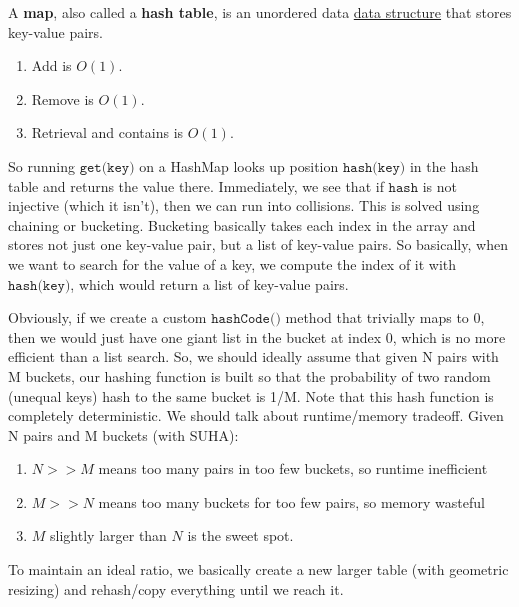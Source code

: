   \begin{definition}[Maps]
    \label{def:maps}
    A \textbf{map}, also called a \textbf{hash table}, is an unordered data \hyperref[def:data-structure]{data structure} that stores key-value pairs.   
    \begin{enumerate}
      \item Add is $O(1)$. 
      \item Remove is $O(1)$. 
      \item Retrieval and contains is $O(1)$. 
    \end{enumerate}
  \end{definition}

  So running $\texttt{get(key)}$ on a HashMap looks up position $\texttt{hash(key)}$ in the hash table and returns the value there. Immediately, we see that if $\texttt{hash}$ is not injective (which it isn't), then we can run into collisions. This is solved using chaining or bucketing. Bucketing basically takes each index in the array and stores not just one key-value pair, but a list of key-value pairs. So basically, when we want to search for the value of a key, we compute the index of it with $\texttt{hash(key)}$, which would return a list of key-value pairs. 

  Obviously, if we create a custom $\texttt{hashCode()}$ method that trivially maps to 0, then we would just have one giant list in the bucket at index 0, which is no more efficient than a list search. So, we should ideally assume that given N pairs with M buckets, our hashing function is built so that the probability of two random (unequal keys) hash to the same bucket is 1/M. Note that this hash function is completely deterministic. We should talk about runtime/memory tradeoff. Given N pairs and M buckets (with SUHA): 
  \begin{enumerate}
      \item $N >> M$ means too many pairs in too few buckets, so runtime inefficient 
      \item $M >> N$ means too many buckets for too few pairs, so memory wasteful 
      \item $M$ slightly larger than $N$ is the sweet spot.
  \end{enumerate}
  To maintain an ideal ratio, we basically create a new larger table (with geometric resizing) and rehash/copy everything until we reach it.


